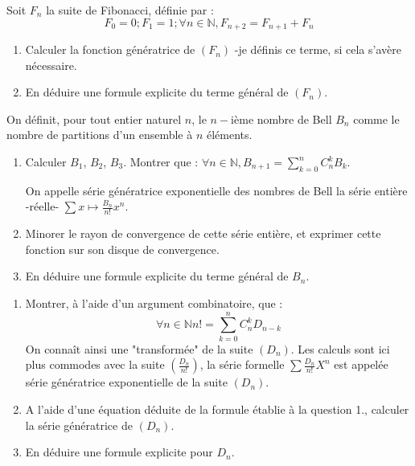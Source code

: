 \begin{exer}
Soit $F_n$ la suite de Fibonacci, définie par :\[F_0 = 0 ; F_1 = 1 ; \forall n \in \mathbb{N} , F_{n+2} = F_{n+1} + F_n\]
\begin{enumerate}
\item Calculer la fonction génératrice de $(F_n)$ -je définis ce terme, si cela s'avère nécessaire.
\item En déduire une formule explicite du terme général de $(F_n)$.
\end{enumerate}
\end{exer}

\begin{exer}
On définit, pour tout entier naturel $n$, le $n-$ième nombre de Bell $B_n$ comme le nombre de partitions d'un ensemble à $n$ éléments.\\
\begin{enumerate}
\item Calculer $B_1$, $B_2$, $B_3$. Montrer que : $\forall n \in \mathbb{N} , B_{n+1} = \sum\limits_{k=0}^n C_n^k B_k$.

On appelle série génératrice exponentielle des nombres de Bell la série entière -réelle- %
$\sum x \mapsto \frac{B_n}{n!} x^n$.
\item Minorer le rayon de convergence de cette série entière, et exprimer cette fonction sur son disque de convergence.
\item En déduire une formule explicite du terme général de $B_n$.
\end{enumerate}
\end{exer}

\begin{exer}
\begin{enumerate}
\item Montrer, à l'aide d'un argument combinatoire, que :\[\forall n \in \mathbb{N} n! = \sum\limits_{k=0}^n C_n^k D_{n-k}\]
On connaît ainsi une "transformée" de la suite $(D_n)$. Les calculs sont ici plus commodes avec la suite $\left(\frac{D_n}{n!}\right)$, la série formelle $\sum \frac{D_n}{n!} X^n$ est appelée série génératrice exponentielle de la suite $(D_n)$.\\
\item A l'aide d'une équation déduite de la formule établie à la question 1., calculer la série génératrice de $(D_n)$.\\
\item En déduire une formule explicite pour $D_n$.
\end{enumerate}
\end{exer}

